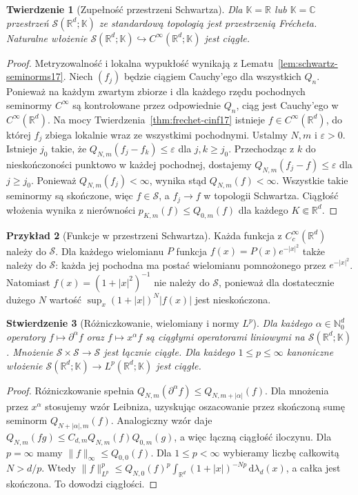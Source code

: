 \documentclass[11pt,a4paper]{article}
\numberwithin{equation}{section}
\theoremstyle{plain}
\newtheorem{twierdzenie}{Twierdzenie}[section]
\newtheorem{stwierdzenie}[twierdzenie]{Stwierdzenie}
\theoremstyle{definition}
\newtheorem{przyklad}[twierdzenie]{Przykład}
\theoremstyle{remark}
\newcommand{\R}{\mathbb R}
\newcommand{\C}{\mathbb C}
\newcommand{\N}{\mathbb N}
\newcommand{\K}{\mathbb K}
\begin{document}
\begin{twierdzenie}[Zupełność przestrzeni Schwartza]
\label{thm:schwartz-frechet17}
Dla $\K=\R$ lub $\K=\C$ przestrzeń $\mathcal S(\R^d;\K)$
ze standardową topologią jest przestrzenią Frécheta.
Naturalne włożenie $\mathcal S(\R^d;\K)\hookrightarrow
C^\infty(\R^d;\K)$ jest ciągłe.
\end{twierdzenie}
\begin{proof}
Metryzowalność i lokalna wypukłość wynikają z
Lematu~\ref{lem:schwartz-seminorms17}.
Niech $(f_j)$ będzie ciągiem Cauchy'ego dla wszystkich $Q_n$.
Ponieważ na każdym zwartym zbiorze i dla każdego rzędu pochodnych
seminormy $C^\infty$ są kontrolowane przez odpowiednie $Q_n$,
ciąg jest Cauchy'ego w $C^\infty(\R^d)$.
Na mocy Twierdzenia~\ref{thm:frechet-cinf17} istnieje
$f\in C^\infty(\R^d)$, do której $f_j$ zbiega lokalnie
wraz ze wszystkimi pochodnymi.
Ustalmy $N,m$ i $\varepsilon>0$. Istnieje $j_0$ takie, że
$Q_{N,m}(f_j-f_k)\le\varepsilon$ dla $j,k\ge j_0$.
Przechodząc z $k$ do nieskończoności punktowo w każdej pochodnej,
dostajemy $Q_{N,m}(f_j-f)\le\varepsilon$ dla $j\ge j_0$.
Ponieważ $Q_{N,m}(f_j)<\infty$, wynika stąd
$Q_{N,m}(f)<\infty$. Wszystkie takie seminormy są skończone,
więc $f\in\mathcal S$, a $f_j\to f$ w topologii Schwartza.
Ciągłość włożenia wynika z nierówności
$p_{K,m}(f)\le Q_{0,m}(f)$ dla każdego $K\Subset\R^d$.
\end{proof}

\begin{przyklad}[Funkcje w przestrzeni Schwartza]
\label{ex:schwartz-functions17}
Każda funkcja z $C_c^\infty(\R^d)$ należy do $\mathcal S$.
Dla każdego wielomianu $P$ funkcja
$f(x)=P(x)e^{-|x|^2}$ także należy do $\mathcal S$:
każda jej pochodna ma postać wielomianu pomnożonego przez
$e^{-|x|^2}$. Natomiast $f(x)=(1+|x|^2)^{-1}$ nie należy
do $\mathcal S$, ponieważ dla dostatecznie dużego $N$
wartość $\sup_x(1+|x|)^N|f(x)|$ jest nieskończona.
\end{przyklad}

\begin{stwierdzenie}[Różniczkowanie, wielomiany i normy $L^p$]
\label{prop:schwartz-operators17}
Dla każdego $\alpha\in\N_0^d$ operatory
$f\mapsto\partial^\alpha f$ oraz $f\mapsto x^\alpha f$
są ciągłymi operatorami liniowymi na $\mathcal S(\R^d;\K)$.
Mnożenie $\mathcal S\times\mathcal S\to\mathcal S$ jest
łącznie ciągłe. Dla każdego $1\le p\le\infty$
kanoniczne włożenie $\mathcal S(\R^d;\K)\to L^p(\R^d;\K)$
jest ciągłe.
\end{stwierdzenie}
\begin{proof}
Różniczkowanie spełnia
$Q_{N,m}(\partial^\alpha f)\le Q_{N,m+|\alpha|}(f)$.
Dla mnożenia przez $x^\alpha$ stosujemy wzór Leibniza,
uzyskując oszacowanie przez skończoną sumę seminorm
$Q_{N+|\alpha|,m}(f)$. Analogiczny wzór daje
$Q_{N,m}(fg)\le C_{d,m}Q_{N,m}(f)Q_{0,m}(g)$,
a więc łączną ciągłość iloczynu.
Dla $p=\infty$ mamy $\|f\|_\infty\le Q_{0,0}(f)$.
Dla $1\le p<\infty$ wybieramy liczbę całkowitą $N>d/p$.
Wtedy
$\|f\|_{L^p}^p\le Q_{N,0}(f)^p
\int_{\R^d}(1+|x|)^{-Np}\,\mathrm d\lambda_d(x)$,
a całka jest skończona. To dowodzi ciągłości.
\end{proof}
\end{document}
